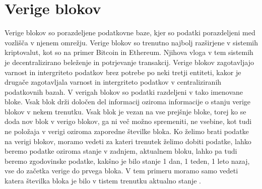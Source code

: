 \documentclass[a4paper,12pt,openright]{book}
\begin{document}
\section{Verige blokov}
Verige blokov so porazdeljene podatkovne baze, kjer so podatki porazdeljeni med vozlišča v njenem omrežju.
Verige blokov so trenutno najbolj razširjene v sistemih kriptovalut, kot so na primer Bitcoin in Ethereum.
Njihova vloga v tem sistemih je decentralizirano beleženje in potrjevanje transakcij.
Verige blokov zagotavljajo varnost in intergriteto podatkov brez potrebe po neki tretji entiteti, kakor je drugače zagotavljala varnost in intergriteto podatkov v centraliziranih podatkovnih bazah.
V verigah blokov so podatki razdeljeni v tako imenovane bloke.
Vsak blok drži določen del informacij oziroma informacije o stanju verige blokov v nekem trenutku.
Vsak blok je vezan na vse prejšnje bloke, torej ko se doda nov blok v verigo blokov, ga ni več možno spremeniti, ne vsebine, kot tudi ne položaja v verigi oziroma zaporedne številke bloka.
Ko želimo brati podatke na verigi blokov, moramo vedeti za kateri trenutek želimo dobiti podatke, lahko beremo podatke oziroma stanje v zadnjem, aktualnem bloku, lahko pa tudi beremo zgodovinske podatke, kakšno je bilo stanje 1 dan, 1 teden, 1 leto nazaj, vse do začetka verige do prvega bloka.
V tem primeru moramo samo vedeti katera številka bloka je bilo v tistem trenutku aktualno stanje \cite{blockchain_explained_investopedia}.
\end{document}
